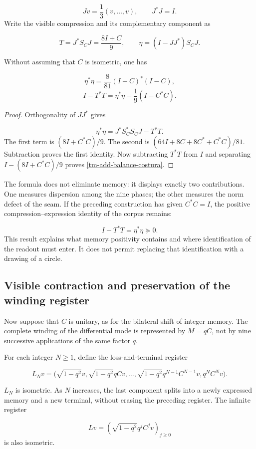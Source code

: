 \[
Jv=\frac13(v,\ldots,v),\qquad J^*J=I.
\]
Write the visible compression and its complementary component as

\[
T=J^*S_CJ=\frac{8I+C}{9},\qquad
\eta=(I-JJ^*)S_CJ.
\]
\begin{proposition}
\label{tm-add-proposicion-costura-1}
Without assuming that \(C\) is isometric, one has

\[
\eta^*\eta=\frac8{81}(I-C)^*(I-C),
\]
\begin{equation}
\boxed{I-T^*T=\eta^*\eta+\frac19(I-C^*C).}
\label{tm-add-balance-costura}
\end{equation}
\end{proposition}

\begin{proof}
Orthogonality of \(JJ^*\) gives

\[
\eta^*\eta=J^*S_C^*S_CJ-T^*T.
\]
The first term is \((8I+C^*C)/9\). The second is \((64I+8C+8C^*+C^*C)/81\). Subtraction proves the first identity. Now subtracting \(T^*T\) from \(I\) and separating \(I-(8I+C^*C)/9\) proves \eqref{tm-add-balance-costura}.
\end{proof}

The formula does not eliminate memory: it displays exactly two contributions. One measures dispersion among the nine phases; the other measures the norm defect of the seam. If the preceding construction has given \(C^*C=I\), the positive compression–expression identity of the corpus remains:

\[
I-T^*T=\eta^*\eta\succeq0.
\]
This result explains what memory positivity contains and where identification of the readout must enter. It does not permit replacing that identification with a drawing of a circle.


\subsection{Visible contraction and preservation of the winding register}
\label{tm-add-c3}
Now suppose that \(C\) is unitary, as for the bilateral shift of integer memory. The complete winding of the differential mode is represented by \(M=qC\), not by nine successive applications of the same factor \(q\).

For each integer \(N\geq1\), define the loss-and-terminal register

\[
L_Nv=\bigl(\sqrt{1-q^2}v,
\sqrt{1-q^2}qCv,\ldots,
\sqrt{1-q^2}q^{N-1}C^{N-1}v, q^NC^Nv\bigr).
\]
\begin{proposition}
\label{tm-add-proposicion-costura-2}
\(L_N\) is isometric. As \(N\) increases, the last component splits into a newly expressed memory and a new terminal, without erasing the preceding register. The infinite register

\[
Lv=\left(\sqrt{1-q^2}q^jC^jv\right)_{j\geq0}
\]
is also isometric.
\end{proposition}

